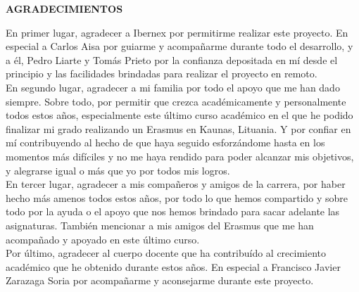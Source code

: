 \begin{center}
{\Large \bfseries AGRADECIMIENTOS}
\vspace{2.5cm}
\end{center}

En primer lugar, agradecer a Ibernex por permitirme realizar este proyecto. En especial a Carlos Aisa por guiarme y acompañarme durante todo el desarrollo, y a él, Pedro Liarte y Tomás Prieto por la confianza depositada en mí desde el principio y las facilidades brindadas para realizar el proyecto en remoto.\\

En segundo lugar, agradecer a mi familia por todo el apoyo que me han dado siempre. Sobre todo, por permitir que crezca académicamente y personalmente todos estos años, especialmente este último curso académico en el que he podido finalizar mi grado realizando un Erasmus en Kaunas, Lituania. Y por confiar en mí contribuyendo al hecho de que haya seguido esforzándome hasta en los momentos más difíciles y no me haya rendido para poder alcanzar mis objetivos, y alegrarse igual o más que yo por todos mis logros. \\

En tercer lugar, agradecer a mis compañeros y amigos de la carrera, por haber hecho más amenos todos estos años, por todo lo que hemos compartido y sobre todo por la ayuda o el apoyo que nos hemos brindado para sacar adelante las asignaturas. También mencionar a mis amigos del Erasmus que me han acompañado y apoyado en este último curso. \\

Por último, agradecer al cuerpo docente que ha contribuído al crecimiento académico que he obtenido durante estos años. En especial a Francisco Javier Zarazaga Soria por acompañarme y aconsejarme durante este proyecto.
